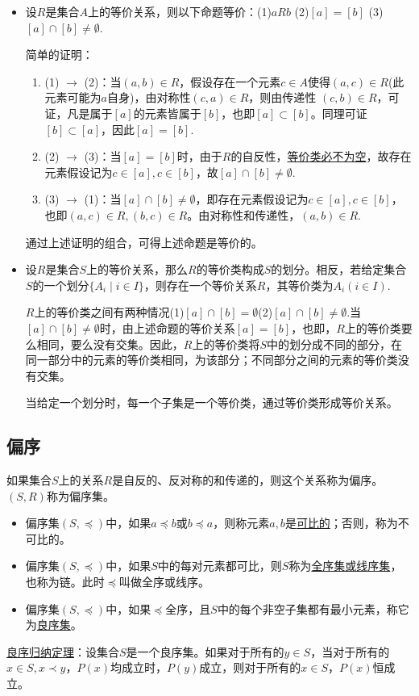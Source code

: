 \begin{itemize}
    \item 设$R$是集合$A$上的等价关系，则以下命题等价：(1)$aRb$ \quad (2)$[a] = [b]$ \quad (3)$[a] \cap [b] \neq \emptyset$.

    简单的证明：
    \begin{enumerate}
        \item (1) $\rightarrow$ (2)：当$(a,b) \in R$，假设存在一个元素$c \in A$使得$(a,c) \in R$(此元素可能为$a$自身)，由对称性$(c,a) \in R$，则由传递性 $(c,b) \in R$，可证，凡是属于$[a]$的元素皆属于$[b]$，也即$[a] \subset [b]$。同理可证$[b] \subset [a]$，因此$[a] = [b]$.

        \item (2) $\rightarrow$ (3)：当$[a] = [b]$时，由于$R$的自反性，\uline{等价类必不为空}，故存在元素假设记为$c \in [a], c \in [b]$，故$[a] \cap [b] \neq \emptyset$.

        \item (3) $\rightarrow$ (1)：当$[a] \cap [b] \neq \emptyset$，即存在元素假设记为$c \in [a], c \in [b]$，也即$(a,c) \in R, (b,c) \in R$。由对称性和传递性，$(a,b) \in R$.
    \end{enumerate}
    通过上述证明的组合，可得上述命题是等价的。

    \item 设$R$是集合$S$上的等价关系，那么$R$的等价类构成$S$的划分。相反，若给定集合$S$的一个划分$\{A_i \mid i \in I\}$，则存在一个等价关系$R$，其等价类为$A_i(i \in I)$.

    $R$上的等价类之间有两种情况(1)$[a] \cap [b] = \emptyset$(2)$[a] \cap [b] \neq \emptyset$.当$[a] \cap [b] \neq \emptyset$时，由上述命题的等价关系$[a] = [b]$，也即，$R$上的等价类要么相同，要么没有交集。因此，$R$上的等价类将$S$中的划分成不同的部分，在同一部分中的元素的等价类相同，为该部分；不同部分之间的元素的等价类没有交集。

    当给定一个划分时，每一个子集是一个等价类，通过等价类形成等价关系。
\end{itemize}

\subsection{偏序}
如果集合$S$上的关系$R$是自反的、反对称的和传递的，则这个关系称为偏序。
$(S,R)$称为偏序集。

\begin{itemize}
    \item 偏序集$(S, \preccurlyeq)$中，如果$a \preccurlyeq b$或$b \preccurlyeq a$，则称元素$a,b$是\uline{可比的}；否则，称为不可比的。
    \item 偏序集$(S, \preccurlyeq)$中，如果$S$中的每对元素都可比，则$S$称为\uline{全序集或线序集}，也称为链。此时$\preccurlyeq$叫做全序或线序。
    \item 偏序集$(S, \preccurlyeq)$中，如果$\preccurlyeq$全序，且$S$中的每个非空子集都有最小元素，称它为\uline{良序集}。
\end{itemize}
\uline{良序归纳定理}：设集合$S$是一个良序集。如果对于所有的$y \in S$，当对于所有的$x \in S, x \prec y$，$P(x)$均成立时，$P(y)$成立，则对于所有的$x \in S$，$P(x)$恒成立。\\

